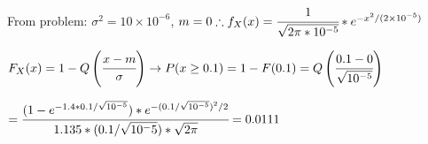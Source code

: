 \documentclass{article}
\begin{document}
	\noindent From problem: $\sigma^2 = 10\times 10^{-6}$, $m = 0 \therefore f_X(x) = \cfrac{1}{\sqrt{2\pi * 10^{-5}}} * e^{-x^2/(2\times 10^{-5})}$
	
	$F_X(x) = 1 - Q\left(\cfrac{x-m}{\sigma}\right) \rightarrow P(x \geq 0.1) = 1 - F(0.1) = Q\left(\cfrac{0.1 - 0}{\sqrt{10^{-5}}}\right)$
	
	$=\cfrac{(1-e^{-1.4*0.1/\sqrt{10^{-5}}}) * e^{-(0.1/\sqrt{10^{-5}})^2/2}}{1.135*(0.1/\sqrt{10^-5})*\sqrt{2\pi}} = 0.0111$
\end{document}
